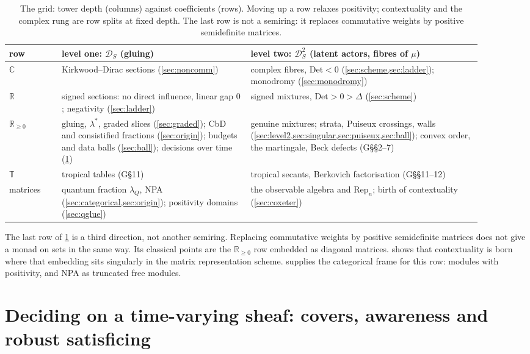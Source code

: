 \documentclass[11pt]{article}
\theoremstyle{definition}\newtheorem{definition}[theorem]{Definition}\newtheorem{remark}[theorem]{Remark}\newtheorem{example}[theorem]{Example}
\newcommand{\R}{\mathbb R}
\providecommand{\D}{\mathcal D}
\providecommand{\T}{\mathbb T}
\begin{document}
\begin{table}[!htbp]\centering\small
\begin{tabular}{p{0.10\linewidth}p{0.36\linewidth}p{0.44\linewidth}}\toprule
row & level one: $\D_S$ (gluing) & level two: $\D_S^2$ (latent actors, fibres of $\mu$)\\\midrule
$\mathbb C$ & Kirkwood--Dirac sections (\cref{sec:noncomm}) & complex fibres, $\mathrm{Det}<0$ (\cref{sec:scheme,sec:ladder}); monodromy (\cref{sec:monodromy})\\
$\R$ & signed sections: no direct influence, linear gap $0$; negativity (\cref{sec:ladder}) & signed mixtures, $\mathrm{Det}>0>\Delta$ (\cref{sec:scheme})\\
$\R_{\ge0}$ & gluing, $\lambda^*$, graded slices (\cref{sec:graded}); CbD and consistified fractions (\cref{sec:origin}); budgets and data balls (\cref{sec:ball}); decisions over time (\cref{sec:decide}) & genuine mixtures; strata, Puiseux crossings, walls (\cref{sec:level2,sec:singular,sec:puiseux,sec:ball}); convex order, the martingale, Beck defects (G\S\S2--7)\\
$\T$ & tropical tables (G\S11) & tropical secants, Berkovich factorisation (G\S\S11--12)\\\midrule
matrices & quantum fraction $\lambda_Q$, NPA (\cref{sec:categorical,sec:origin}); positivity domains (\cref{sec:qglue}) & the observable algebra and $\mathrm{Rep}_n$; birth of contextuality (\cref{sec:coxeter})\\\bottomrule
\end{tabular}
\caption{The grid: tower depth (columns) against coefficients (rows). Moving up a row relaxes positivity; contextuality and the complex rung
are row splits at fixed depth. The last row is not a semiring: it replaces commutative weights by positive semidefinite matrices.}\label{tab:grid}
\end{table}

The last row of \cref{tab:grid} is a third direction, not another semiring. Replacing commutative weights by positive semidefinite
matrices does not give a monad on sets in the same way. Its classical points are the $\R_{\ge0}$ row embedded as diagonal matrices.
 shows that contextuality is born where that embedding sits singularly in the matrix representation scheme.
 supplies the categorical frame for this row: modules with positivity, and NPA as truncated free modules.

\section{Deciding on a time-varying sheaf: covers, awareness and robust satisficing}\label{sec:decide}
\end{document}
